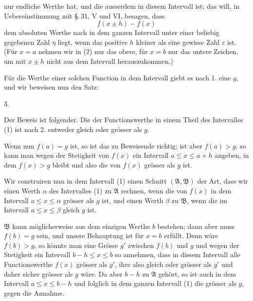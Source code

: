 
nur endliche Werthe hat, und die ausserdem in diesem Intervall  ist; das will, in Uebereinstimmung mit \S.\,31, V und VI, besagen, dass
\begin{equation}
 f(x\pm h)-f(x)
\tag{2}
\end{equation}
dem absoluten Werthe nach in dem ganzen Intervall unter einer beliebig gegebenen Zahl $\eta$ liegt, wenn das positive $h$ kleiner als eine gewisse Zahl $\varepsilon$ ist. (Für $x=a$ nehmen wir in (2) nur das obere, für $x=b$ nur das untere Zeichen, um mit $x\pm h$ nicht aus dem Intervall herauszukommen.)

Für die Werthe einer solchen Function in dem Intervall giebt es nach 1. eine  $g$, und wir beweisen nun den Satz:

3. 

Der Beweis ist folgender. Die  der Functionswerthe in einem Theil des Intervalles (1) ist nach 2. entweder gleich oder grösser als $g$.

Wenn nun $f(a)=g$ ist, so ist das zu Beweisende richtig; ist aber $f(a)>g$, so kann man wegen der Stetigkeit von $f(x)$ ein Intervall $a\le x\le a+h$ angeben, in dem $f(x)>g$ bleibt und also die  von $f(x)$ grösser als $g$ ist.

Wir construiren nun in dem Intervall (1) einen Schnitt $(\mathfrak A,\mathfrak B)$ der Art, dass wir einen Werth $\alpha$ des Intervalles (1) zu $\mathfrak A$ rechnen, wenn die  von $f(x)$ in dem Intervall $a\le x\le \alpha$ grösser als $g$ ist, und einen Werth $\beta$ zu $\mathfrak B$, wenn die  im Intervall $a\le x\le \beta$ gleich $g$ ist.

$\mathfrak B$ kann möglicherweise aus dem einzigen Werthe $b$ bestehen; dann aber muss $f(b)=g$ sein, und unsere Behauptung ist für $x=b$ erfüllt. Denn wäre $f(b)>g$, so könnte man eine Grösse $g'$ zwischen $f(b)$ und $g$ und wegen der Stetigkeit ein Intervall $b-h\le x\le b$ so annehmen, dass in diesem Intervall alle Functionswerthe $f(x)$ grösser als $g'$, ihre  also gleich oder grösser als $g'$ und daher sicher grösser als $g$ wäre. Da aber $b-h$ zu $\mathfrak A$ gehört, so ist auch in dem Intervall $a\le x\le b-h$ und folglich in dem ganzen Intervall (1) die  grösser als $g$, gegen die Annahme.
